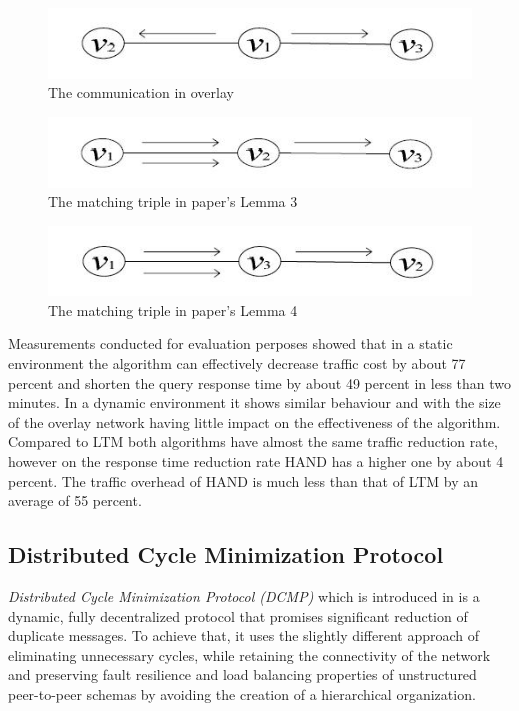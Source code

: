 \documentclass[a4paper,10pt]{article}
\begin{document}
\begin{figure}
\centering
  \includegraphics[scale=0.4]{img/hand_com_overlay.jpeg}
\caption{The communication in overlay}
\label{figure:hand_com_overlay}
\end{figure}

\begin{figure}
\centering
  \includegraphics[scale=0.4]{img/hand_matchtriple_lemma3.jpeg}
\caption{The matching triple in paper's Lemma 3}
\label{figure:hand_matchtriple_lemma3}
\end{figure}

\begin{figure}
\centering
  \includegraphics[scale=0.4]{img/hand_matchtriple_lemma4.jpeg}
\caption{The matching triple in paper's Lemma 4}
\label{figure:hand_matchtriple_lemma4}
\end{figure}

Measurements conducted for evaluation perposes showed that in a static environment the algorithm can effectively decrease traffic cost by about 77 percent and shorten the query response time by about 49 percent in less than two minutes. In a dynamic environment it shows similar behaviour and with the size of the overlay network having little impact on the effectiveness of the algorithm. Compared to LTM both algorithms have almost the same traffic reduction rate, however on the response time reduction rate HAND has a higher one by about 4 percent. The traffic overhead of HAND is much less than that of LTM by an average of 55 percent.

\subsection{Distributed Cycle Minimization Protocol}
\emph{Distributed Cycle Minimization Protocol (DCMP)} which is introduced in \cite{zhu_dcmp_2008} is a dynamic, fully decentralized protocol that promises significant reduction of duplicate messages. To achieve that, it uses the slightly different approach of eliminating unnecessary cycles, while retaining the connectivity of the network and preserving fault resilience and load balancing properties of unstructured peer-to-peer schemas by avoiding the creation of a hierarchical organization.
\end{document}
